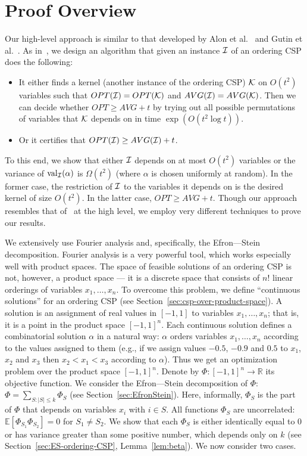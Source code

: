 \documentclass[11pt]{article}
\DeclareMathOperator {\val}  {val}
\newcommand {\Exp}       {\mathbb{E}}
\newcommand {\E}     [1] {\Exp\left[#1\right]}
\begin{document}
\section{Proof Overview}\label{sec:proof-overview}
Our high-level approach is similar to that developed by Alon et al.~\cite{AGKSY} and Gutin et al.~\cite{GKSY, GKMY, GIMY}.
As in~\cite{GKSY, GKMY, GIMY}, we design an algorithm that given an instance $\cal I$ of an ordering CSP does the following:
\begin{itemize}
\item It either finds a kernel (another instance of the ordering CSP) $\cal K$ on $O(t^2)$ variables such that $OPT({\cal I}) = OPT({\cal K})$ and $AVG({\cal I}) = AVG({\cal K})$.
Then we can decide whether $OPT \geq AVG + t$ by trying out all possible permutations of variables that $\cal K$ depends on in time $\exp(O(t^2 \log t))$.
\item Or it certifies that $OPT({\cal I}) \geq AVG({\cal I}) + t$.
\end{itemize}
To this end, we show that either $\cal I$ depends on at most $O(t^2)$ variables or the variance of $\val_{\cal I} (\alpha)$ is $\Omega(t^2)$ (where $\alpha$ is chosen uniformly at random). In the former case, the restriction of $\cal I$ to the variables it depends on is the desired kernel of size $O(t^2)$. In the latter case, $OPT \geq AVG + t$.
Though our approach resembles that of~\cite{GKSY, GKMY, GIMY} at the high level, we employ very different techniques to prove our results.

We extensively use Fourier analysis and, specifically, the Efron---Stein decomposition. Fourier analysis is a very powerful tool, which works especially well with product spaces. The space of feasible solutions of an ordering CSP is not, however, a product space --- it is a discrete space
that consists of $n!$ linear orderings of variables $x_1,\dots, x_n$. To overcome this problem, we define ``continuous solutions'' for an ordering
CSP (see Section~\ref{sec:csp-over-product-space}). A solution  is an assignment of real values in $[-1,1]$ to variables $x_1,\dots, x_n$; that is, it is a point in the product space $[-1,1]^n$. Each continuous solution defines a combinatorial solution $\alpha$ in a natural way: $\alpha$ orders variables $x_1,\dots, x_n$ according to the values assigned to them (e.g., if we assign values $-0.5$, $-0.9$ and $0.5$ to $x_1$, $x_2$ and $x_3$ then $x_2 < x_1 < x_3$ according to $\alpha$). Thus we get an optimization problem over the product space $[-1,1]^n$.
Denote by $\Phi:[-1,1]^n \to {\mathbb R}$ its objective function.
We consider the Efron---Stein decomposition of $\Phi$: $\Phi = \sum_{S: |S|\leq k} \Phi_S$ (see Section~\ref{sec:EfronStein}). Here, informally, $\Phi_S$ is the part of $\Phi$ that depends on variables $x_i$ with $i\in S$. All functions $\Phi_S$ are uncorrelated: $\E{\Phi_{S_1} \Phi_{S_2}} = 0$ for $S_1 \neq S_2$. We show that each $\Phi_S$ is either identically equal to $0$ or has variance greater than some positive number, which depends only on $k$ (see Section~\ref{sec:ES-ordering-CSP}, Lemma~\ref{lem:beta}).
We now consider two cases.
\end{document}
